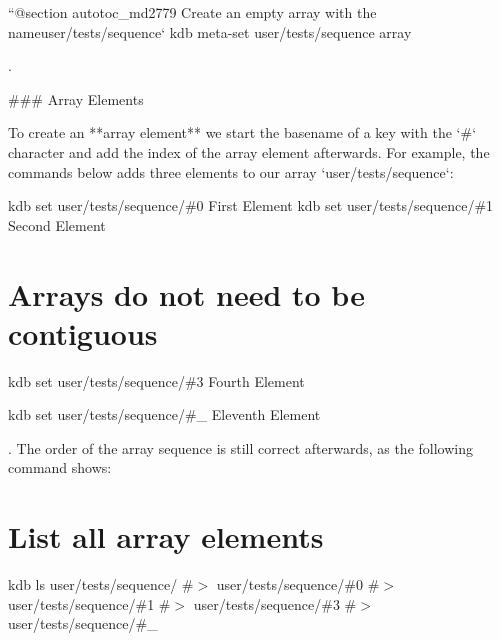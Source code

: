 ``{\ttfamily  @section autotoc\+\_\+md2779 Create an empty array with the name}user/tests/sequence` kdb meta-\/set user/tests/sequence array \textquotesingle{}\textquotesingle{} 
\begin{DoxyCode}
.

### Array Elements

To create an **array element** we start the basename of a key with the `#` character and add the index of
       the array element afterwards. For example, the commands below adds three elements to our array
       `user/tests/sequence`:
\end{DoxyCode}
 kdb set user/tests/sequence/\#0 \textquotesingle{}First Element\textquotesingle{} kdb set user/tests/sequence/\#1 \textquotesingle{}Second Element\textquotesingle{} \hypertarget{doc_tutorials_arrays_md_autotoc_md2780}{}\section{Arrays do not need to be contiguous}\label{doc_tutorials_arrays_md_autotoc_md2780}
kdb set user/tests/sequence/\#3 \textquotesingle{}Fourth Element\textquotesingle{} 
 kdb set user/tests/sequence/\#\+\_ \textquotesingle{}Eleventh Element\textquotesingle{} 
\begin{DoxyCode}
. The order of the array sequence is still correct afterwards, as the following command shows:
\end{DoxyCode}
 \hypertarget{doc_tutorials_arrays_md_autotoc_md2781}{}\section{List all array elements}\label{doc_tutorials_arrays_md_autotoc_md2781}
kdb ls user/tests/sequence/ \#$>$ user/tests/sequence/\#0 \#$>$ user/tests/sequence/\#1 \#$>$ user/tests/sequence/\#3 \#$>$ user/tests/sequence/\#\+\_ 
